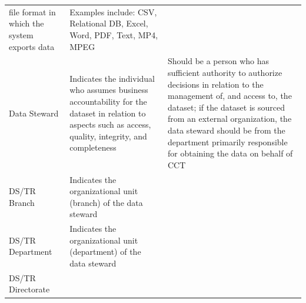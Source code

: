 \documentclass[
]{book}
\begin{document}
\begin{longtable}[]{@{}lll@{}}
\begin{minipage}[t]{0.35\columnwidth}
file format in which the
system exports data\strut
\end{minipage} & \begin{minipage}[t]{0.35\columnwidth}\raggedright
Examples include: CSV,
Relational DB, Excel,
Word, PDF, Text, MP4,
MPEG\strut
\end{minipage}\tabularnewline
\begin{minipage}[t]{0.22\columnwidth}\raggedright
Data Steward\strut
\end{minipage} & \begin{minipage}[t]{0.35\columnwidth}\raggedright
Indicates the individual
who assumes business
accountability for the
dataset in relation to
aspects such as access,
quality, integrity, and
completeness\strut
\end{minipage} & \begin{minipage}[t]{0.35\columnwidth}\raggedright
Should be a person who
has sufficient authority
to authorize decisions in
relation to the
management of, and access
to, the dataset; if the
dataset is sourced from
an external organization,
the data steward should
be from the department
primarily responsible for
obtaining the data on
behalf of CCT\strut
\end{minipage}\tabularnewline
\begin{minipage}[t]{0.22\columnwidth}\raggedright
DS/TR Branch\strut
\end{minipage} & \begin{minipage}[t]{0.35\columnwidth}\raggedright
Indicates the
organizational unit
(branch) of the data
steward\strut
\end{minipage} & \begin{minipage}[t]{0.35\columnwidth}\raggedright
\strut
\end{minipage}\tabularnewline
\begin{minipage}[t]{0.22\columnwidth}\raggedright
DS/TR
Department\strut
\end{minipage} & \begin{minipage}[t]{0.35\columnwidth}\raggedright
Indicates the
organizational unit
(department) of the data
steward\strut
\end{minipage} & \begin{minipage}[t]{0.35\columnwidth}\raggedright
\strut
\end{minipage}\tabularnewline
\begin{minipage}[t]{0.22\columnwidth}\raggedright
DS/TR
Directorate\strut
\end{minipage} & \begin{minipage}[t]{0.35\columnwidth}\raggedright

\end{minipage}
\end{longtable}
\end{document}
